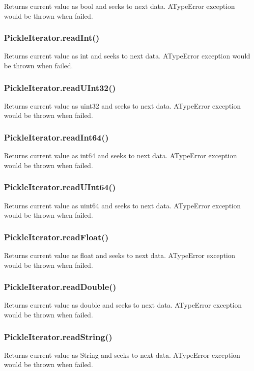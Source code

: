Returns current value as {\ttfamily bool} and seeks to next data. A{\ttfamily Type\+Error} exception would be thrown when failed.

\subsubsection*{Pickle\+Iterator.\+read\+Int()}

Returns current value as {\ttfamily int} and seeks to next data. A{\ttfamily Type\+Error} exception would be thrown when failed.

\subsubsection*{Pickle\+Iterator.\+read\+U\+Int32()}

Returns current value as {\ttfamily uint32} and seeks to next data. A{\ttfamily Type\+Error} exception would be thrown when failed.

\subsubsection*{Pickle\+Iterator.\+read\+Int64()}

Returns current value as {\ttfamily int64} and seeks to next data. A{\ttfamily Type\+Error} exception would be thrown when failed.

\subsubsection*{Pickle\+Iterator.\+read\+U\+Int64()}

Returns current value as {\ttfamily uint64} and seeks to next data. A{\ttfamily Type\+Error} exception would be thrown when failed.

\subsubsection*{Pickle\+Iterator.\+read\+Float()}

Returns current value as {\ttfamily float} and seeks to next data. A{\ttfamily Type\+Error} exception would be thrown when failed.

\subsubsection*{Pickle\+Iterator.\+read\+Double()}

Returns current value as {\ttfamily double} and seeks to next data. A{\ttfamily Type\+Error} exception would be thrown when failed.

\subsubsection*{Pickle\+Iterator.\+read\+String()}

Returns current value as {\ttfamily String} and seeks to next data. A{\ttfamily Type\+Error} exception would be thrown when failed. 